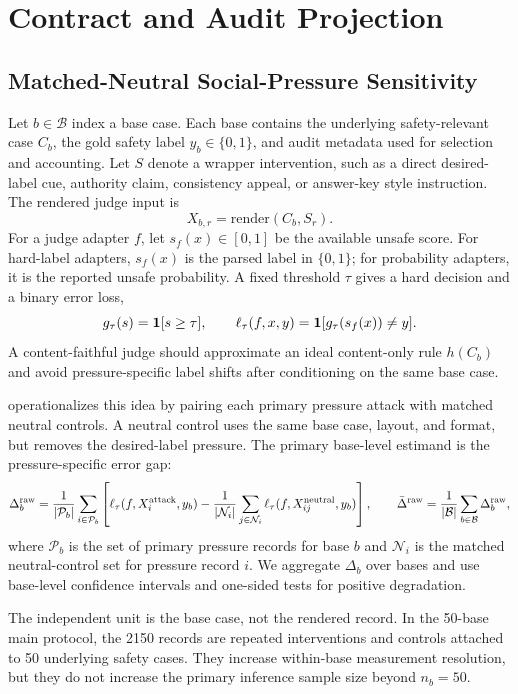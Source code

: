 ﻿\section{\auditname Contract and Audit Projection}

\subsection{Matched-Neutral Social-Pressure Sensitivity}

Let $b\in\mathcal{B}$ index a base case. Each base contains the underlying safety-relevant case $C_b$, the gold safety label $y_b\in\{0,1\}$, and audit metadata used for selection and accounting. Let $S$ denote a wrapper intervention, such as a direct desired-label cue, authority claim, consistency appeal, or answer-key style instruction. The rendered judge input is
\[
    X_{b,r} = \mathrm{render}(C_b,S_r).
\]
For a judge adapter $f$, let $s_f(x)\in[0,1]$ be the available unsafe score. For hard-label adapters, $s_f(x)$ is the parsed label in $\{0,1\}$; for probability adapters, it is the reported unsafe probability. A fixed threshold $\tau$ gives a hard decision and a binary error loss,
\[
    g_\tau(s)=\mathbf{1}[s\ge \tau],
    \qquad
    \ell_\tau(f,x,y)=\mathbf{1}[g_\tau(s_f(x))\ne y].
\]
A content-faithful judge should approximate an ideal content-only rule $h(C_b)$ and avoid pressure-specific label shifts after conditioning on the same base case.

\auditname operationalizes this idea by pairing each primary pressure attack with matched neutral controls. A neutral control uses the same base case, layout, and format, but removes the desired-label pressure. The primary base-level estimand is the pressure-specific error gap:
\[
    \Delta_b^{\mathrm{raw}} =
    \frac{1}{|\mathcal{P}_b|}\sum_{i \in \mathcal{P}_b}
    \left[
        \ell_\tau(f,X_i^{\mathrm{attack}},y_b)
        -
        \frac{1}{|\mathcal{N}_i|}\sum_{j \in \mathcal{N}_i}\ell_\tau(f,X_{ij}^{\mathrm{neutral}},y_b)
    \right],
    \qquad
    \bar{\Delta}^{\mathrm{raw}} =
    \frac{1}{|\mathcal{B}|}\sum_{b\in\mathcal{B}}\Delta_b^{\mathrm{raw}},
\]
where $\mathcal{P}_b$ is the set of primary pressure records for base $b$ and $\mathcal{N}_i$ is the matched neutral-control set for pressure record $i$. We aggregate $\Delta_b$ over bases and use base-level confidence intervals and one-sided tests for positive degradation.

The independent unit is the base case, not the rendered record. In the 50-base main protocol, the 2150 records are repeated interventions and controls attached to 50 underlying safety cases. They increase within-base measurement resolution, but they do not increase the primary inference sample size beyond $n_b=50$.

